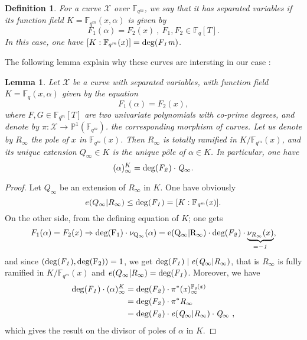 \documentclass[10pt]{article}
\newtheorem{def1}{Definition}[]
\newtheorem{lem1}{Lemma}[]
\newcommand{\s}{\vspace{0.3cm}}
\newcommand{\cd}{\cdot}
\newcommand{\fqm}{\mathbb{F}_{q^m}}
\newcommand{\fq}{\mathbb{F}_q}
\newcommand{\X}{\mathcal{X}}
\begin{document}
\s

\begin{def1}
For a curve $\X$ over $\fqm$, we say that it has separated variables if its function field $K=\fqm(x,\alpha)$ is given by
\[F_1(\alpha) = F_2(x) \ , \ F_1,F_2 \in \fq[T].\]
In this case, one have $[K:\fqm(x)] = \rm{deg}(\it{F_1}m)$.
\end{def1}

\s

The following lemma explain why these curves are intersting in our case :

\s

\begin{lem1}
Let $\X$ be a curve with separated variables, with function field $K=\fq(x,\alpha)$ given by the equation
\[F_1(\alpha) = F_2(x),\]
where $F,G \in \fqm[T]$ are two univariate polynomials with co-prime degrees, and denote by $\pi : \X \rightarrow \mathbb{P}^1(\fqm)$. the corresponding morphism of curves. Let us denote by $R_{\infty}$ the pole of $x$ in $\fqm(x)$. Then $R_{\infty}$ is totally ramified in $K/\fqm(x)$, and its unique extension $Q_{\infty} \in K$ is the unique pôle of $\alpha \in K$. In particular, one have 
\[(\alpha)^K_{\infty} = \rm{deg}\it{(F_2) \cd Q_{\infty}}.\]
\end{lem1}

\s

\begin{proof}
Let $Q_{\infty}$ be an extension of $R_{\infty}$ in $K$. One have obviously
\[e(Q_{\infty}|R_{\infty}) \leq \rm{deg}\it(F_1)=[K:\fqm(x)].\]
On the other side, from the defining equation of $K$; one gets
\[F_1(\alpha) = F_2(x) \Rightarrow \rm{deg}(F_1) \cd \nu_{Q_{\infty}}(\alpha) = e(Q_{\infty}|R_{\infty}) \cd \rm{deg}\it(F_2) \cd \underbrace{\nu_{R_{\infty}}(x)}_{=-1},\]
and since $(\rm{deg}\it(F_1),\rm{deg}(F_2))=1$, we get $\rm{deg}\it(F_1) \mid e(Q_{\infty}|R_{\infty})$, that is $R_{\infty}$ is fully ramified in $K/\fqm(x)$ and $e(Q_{\infty}|R_{\infty})=\rm{deg}\it(F_1)$. Moreover, we have 
\begin{align*}
\rm{deg}\it(F_1) \cd (\alpha)^K_{\infty} &= \rm{deg}\it(F_2) \cd \pi^*(x)^{\fq(x)}_{\infty} \\
&= \rm{deg}\it(F_2) \cd \pi^* R_{\infty} \\
&= \rm{deg}\it(F_2) \cd e(Q_{\infty}|R_{\infty}) \cd Q_{\infty} \ ,
\end{align*}
which gives the result on the divisor of poles of $\alpha$ in $K$.
\end{proof}
\end{document}
